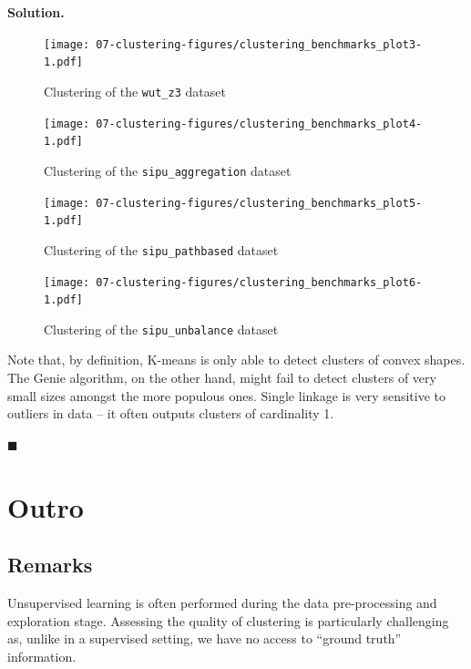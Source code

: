 \documentclass[10pt,b5paper,krantz1]{krantz}
\newenvironment{solution}{%
\bigskip\noindent\textbf{Solution. }%
\it\ignorespaces%
\ignorespaces%
}{\ignorespaces%
\hfill$\blacksquare$%
}
\begin{document}
\begin{solution}
\begin{figure}
\hypertarget{fig:clustering_benchmarks_plot3}{%
\centering
\texttt{[image: 07-clustering-figures/clustering\_benchmarks\_plot3-1.pdf]}
\caption{Clustering of the \texttt{wut\_z3} dataset}\label{fig:clustering_benchmarks_plot3}
}
\end{figure}

\begin{figure}
\hypertarget{fig:clustering_benchmarks_plot4}{%
\centering
\texttt{[image: 07-clustering-figures/clustering\_benchmarks\_plot4-1.pdf]}
\caption{Clustering of the \texttt{sipu\_aggregation} dataset}\label{fig:clustering_benchmarks_plot4}
}
\end{figure}

\begin{figure}
\hypertarget{fig:clustering_benchmarks_plot5}{%
\centering
\texttt{[image: 07-clustering-figures/clustering\_benchmarks\_plot5-1.pdf]}
\caption{Clustering of the \texttt{sipu\_pathbased} dataset}\label{fig:clustering_benchmarks_plot5}
}
\end{figure}

\begin{figure}
\hypertarget{fig:clustering_benchmarks_plot6}{%
\centering
\texttt{[image: 07-clustering-figures/clustering\_benchmarks\_plot6-1.pdf]}
\caption{Clustering of the \texttt{sipu\_unbalance} dataset}\label{fig:clustering_benchmarks_plot6}
}
\end{figure}

Note that, by definition, K-means is only able to detect clusters
of convex shapes. The Genie algorithm, on the other hand, might
fail to detect clusters of very small sizes amongst the more populous ones.
Single linkage is very sensitive to outliers in data -- it often outputs
clusters of cardinality 1.

\end{solution}

\hypertarget{outro-6}{%
\section{Outro}\label{outro-6}}

\hypertarget{remarks-6}{%
\subsection{Remarks}\label{remarks-6}}

Unsupervised learning is often performed during the data pre-processing
and exploration stage.
Assessing the quality of clustering is particularly challenging as,
unlike in a supervised setting,
we have no access to ``ground truth'' information.
\end{document}
